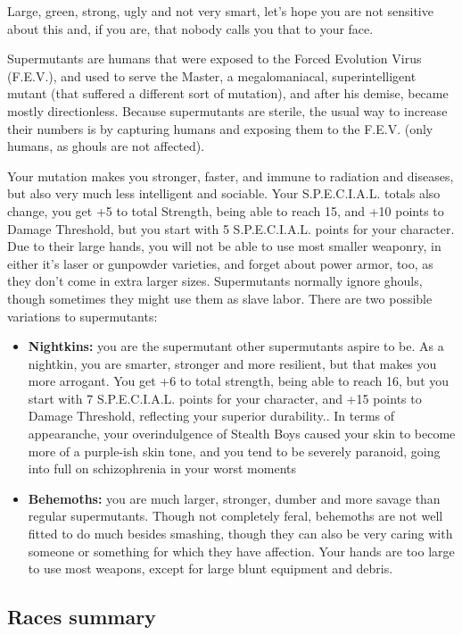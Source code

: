 \documentclass[11pt]{article} %
\begin{document}
Large, green, strong, ugly and not very smart, let's hope you are not sensitive about this and, if you are, that nobody calls you that to your face. 

Supermutants are humans that were exposed to the Forced Evolution Virus (F.E.V.), and used to serve the Master, a megalomaniacal, superintelligent mutant (that suffered a different sort of mutation), and after his demise, became mostly directionless. Because supermutants are sterile, the usual way to increase their numbers is by capturing humans and exposing them to the F.E.V. (only humans, as ghouls are not affected). 

Your mutation makes you stronger, faster, and immune to radiation and diseases, but also very much less intelligent and sociable. Your S.P.E.C.I.A.L. totals also change, you get +5 to total Strength, being able to reach 15, and +10 points to Damage Threshold, but you start with 5 S.P.E.C.I.A.L. points for your character. Due to their large hands, you will not be able to use most smaller weaponry, in either it's laser or gunpowder varieties, and forget about power armor, too, as they don't come in extra larger sizes. Supermutants normally ignore ghouls, though sometimes they might use them as slave labor. There are two possible variations to supermutants:

\begin{itemize}
	\item \textbf{Nightkins:} you are the supermutant other supermutants aspire to be. As a nightkin, you are smarter, stronger and more resilient, but that makes you more arrogant. You get +6 to total strength, being able to reach 16, but you start with 7 S.P.E.C.I.A.L. points for your character, and +15 points to Damage Threshold, reflecting your superior durability.. In terms of appearanche, your overindulgence of Stealth Boys caused your skin to become more of a purple-ish skin tone, and you tend to be severely paranoid, going into full on schizophrenia in your worst moments
	\item \textbf{Behemoths:} you are much larger, stronger, dumber and more savage than regular supermutants. Though not completely feral, behemoths are not well fitted to do much besides smashing, though they can also be very caring with someone or something for which they have affection. Your hands are too large to use most weapons, except for large blunt equipment and debris.
\end{itemize}

\subsection{Races summary}
\end{document}
